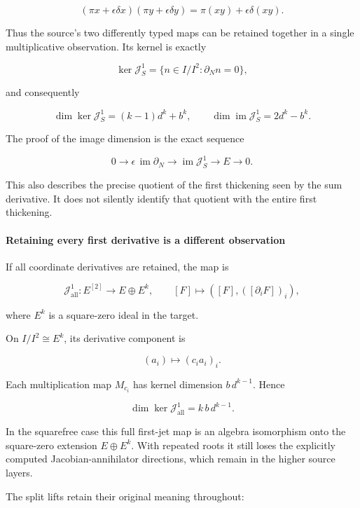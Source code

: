 \[
(\pi x+\epsilon\delta x)(\pi y+\epsilon\delta y)
=
\pi(xy)+\epsilon\delta(xy).
\]

Thus the source's two differently typed maps can be retained together in a single multiplicative
observation. Its kernel is exactly

\[
\ker\mathcal J_S^1
=
\{n\in I/I^2:\partial_Nn=0\},
\]

and consequently

\[
\boxed{
\dim\ker\mathcal J_S^1=(k-1)d^k+b^k,
\qquad
\dim\operatorname{im}\mathcal J_S^1=2d^k-b^k.
}
\]

The proof of the image dimension is the exact sequence

\[
0\longrightarrow\epsilon\,\operatorname{im}\partial_N
\longrightarrow\operatorname{im}\mathcal J_S^1
\longrightarrow E\longrightarrow0.
\]

This also describes the precise quotient of the first thickening seen by the sum derivative. It does
not silently identify that quotient with the entire first thickening.

\paragraph{Retaining every first derivative is a different
observation}\label{conormal_tower_pasted:retaining-every-first-derivative-is-a-different-observation}

If all coordinate derivatives are retained, the map is

\[
\mathcal J_{\mathrm{all}}^1:
E^{[2]}\longrightarrow E\oplus E^k,
\qquad
[F]\longmapsto
\left([F],([\partial_iF])_i\right),
\]

where \(E^k\) is a square-zero ideal in the target.

On \(I/I^2\cong E^k\), its derivative component is

\[
(a_i)\longmapsto(c_i a_i)_i.
\]

Each multiplication map \(M_{c_i}\) has kernel dimension \(b\,d^{k-1}\). Hence

\[
\boxed{
\dim\ker\mathcal J_{\mathrm{all}}^1
=
k\,b\,d^{k-1}.
}
\]

In the squarefree case this full first-jet map is an algebra isomorphism onto the square-zero
extension \(E\oplus E^k\). With repeated roots it still loses the explicitly computed
Jacobian-annihilator directions, which remain in the higher source layers.

The split lifts retain their original meaning throughout:

